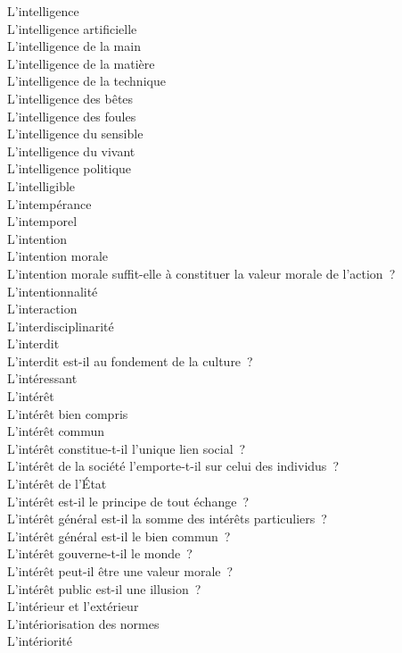 \documentclass[a4paper,12pt]{article}
\begin{document}
L'intelligence \\
L'intelligence artificielle \\
L'intelligence de la main \\
L'intelligence de la matière \\
L'intelligence de la technique \\
L'intelligence des bêtes \\
L'intelligence des foules \\
L'intelligence du sensible \\
L'intelligence du vivant \\
L'intelligence politique \\
L'intelligible \\
L'intempérance \\
L'intemporel \\
L'intention \\
L'intention morale \\
L'intention morale suffit-elle à constituer la valeur morale de l'action ? \\
L'intentionnalité \\
L'interaction \\
L'interdisciplinarité \\
L'interdit \\
L'interdit est-il au fondement de la culture ? \\
L'intéressant \\
L'intérêt \\
L'intérêt bien compris \\
L'intérêt commun \\
L'intérêt constitue-t-il l'unique lien social ? \\
L'intérêt de la société l'emporte-t-il sur celui des individus ? \\
L'intérêt de l'État \\
L'intérêt est-il le principe de tout échange ? \\
L'intérêt général est-il la somme des intérêts particuliers ? \\
L'intérêt général est-il le bien commun ? \\
L'intérêt gouverne-t-il le monde ? \\
L'intérêt peut-il être une valeur morale ? \\
L'intérêt public est-il une illusion ? \\
L'intérieur et l'extérieur \\
L'intériorisation des normes \\
L'intériorité \\
\end{document}
